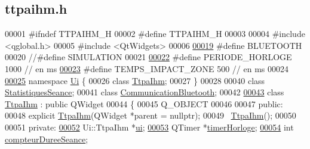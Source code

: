 \hypertarget{ttpaihm_8h_source}{}\subsection{ttpaihm.\+h}
\label{ttpaihm_8h_source}

\begin{DoxyCode}
00001 \textcolor{preprocessor}{#ifndef TTPAIHM\_H}
00002 \textcolor{preprocessor}{#define TTPAIHM\_H}
00003 
00004 \textcolor{preprocessor}{#include <qglobal.h>}
00005 \textcolor{preprocessor}{#include <QtWidgets>}
00006 
\hyperlink{ttpaihm_8h_a3f30897fa8435dc9811642367a328be8}{00019} \textcolor{preprocessor}{#define BLUETOOTH }
00020 \textcolor{preprocessor}{//#define SIMULATION}
00021 
\hyperlink{ttpaihm_8h_abe1de80d8a7149cf82da305f032d7b1e}{00022} \textcolor{preprocessor}{#define PERIODE\_HORLOGE     1000 // en ms}
\hyperlink{ttpaihm_8h_a9b6e17fdcabfecc63689f88d52e369ad}{00023} \textcolor{preprocessor}{#define TEMPS\_IMPACT\_ZONE    500 // en ms}
00024 
\hyperlink{namespace_ui}{00025} \textcolor{keyword}{namespace }\hyperlink{namespace_ui}{Ui} \{
00026 \textcolor{keyword}{class }\hyperlink{class_ttpa_ihm}{TtpaIhm};
00027 \}
00028 
00040 \textcolor{keyword}{class }\hyperlink{class_statistiques_seance}{StatistiquesSeance};
00041 \textcolor{keyword}{class }\hyperlink{class_communication_bluetooth}{CommunicationBluetooth};
00042 
\hyperlink{class_ttpa_ihm}{00043} \textcolor{keyword}{class }\hyperlink{class_ttpa_ihm}{TtpaIhm} : \textcolor{keyword}{public} QWidget
00044     \{
00045         Q\_OBJECT
00046 
00047     \textcolor{keyword}{public}:
00048         \textcolor{keyword}{explicit} \hyperlink{class_ttpa_ihm}{TtpaIhm}(QWidget *parent = \textcolor{keyword}{nullptr});
00049         ~\hyperlink{class_ttpa_ihm}{TtpaIhm}();
00050 
00051     \textcolor{keyword}{private}:
\hyperlink{class_ttpa_ihm_ad5fae1222a667da158c26f3d0f0dce23}{00052}         Ui::TtpaIhm *\hyperlink{class_ttpa_ihm_ad5fae1222a667da158c26f3d0f0dce23}{ui}; 
\hyperlink{class_ttpa_ihm_a447ad7262efa01d22bc3222e0e470087}{00053}         QTimer *\hyperlink{class_ttpa_ihm_a447ad7262efa01d22bc3222e0e470087}{timerHorloge}; 
\hyperlink{class_ttpa_ihm_abb5ab7cc023685e40cb278f0210f276f}{00054}         \textcolor{keywordtype}{int} \hyperlink{class_ttpa_ihm_abb5ab7cc023685e40cb278f0210f276f}{compteurDureeSeance}; 

\end{DoxyCode}
